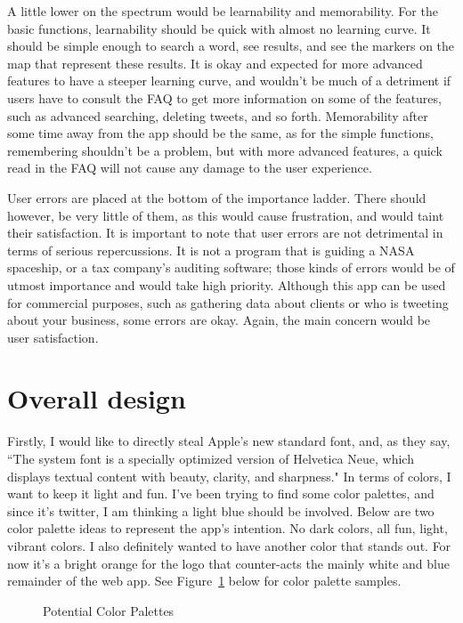 \documentclass[11pt]{article}
\begin{document}
A little lower on the spectrum would be learnability and memorability. For the basic functions, learnability should be quick with almost no learning curve. It should be simple enough to search a word, see results, and see the markers on the map that represent these results. It is okay and expected for more advanced features to have a steeper learning curve, and wouldn't  be much of a detriment if users have to consult the FAQ to get more information on some of the features, such as advanced searching, deleting tweets, and so forth. Memorability after some time away from the app should be the same, as for the simple functions, remembering shouldn't be a problem, but with more advanced features, a quick read in the FAQ will not cause any damage to the user experience.

User errors are placed at the bottom of the importance ladder. There should however, be very little of them, as this would cause frustration, and would taint their satisfaction. It is important to note that user errors are not detrimental in terms of serious repercussions. It is not a program that is guiding a NASA spaceship, or a tax company's auditing software; those kinds of errors would be of utmost importance and would take high priority. Although this app can be used for commercial purposes, such as gathering data about clients or who is tweeting about your business, some errors are okay. Again, the main concern would be user satisfaction.


\section{Overall design}
Firstly, I would like to directly steal Apple's new standard font, and, as they say, ``The system font is a specially optimized version of Helvetica Neue, which displays textual content with beauty, clarity, and sharpness." In terms of colors, I want to keep it light and fun. I've been trying to find some color palettes, and since it's twitter, I am thinking a light blue should be involved.  Below are two color palette ideas to represent the app's intention. No dark colors, all fun, light, vibrant colors. I also definitely wanted to have another color that stands out. For now it's a bright orange for the logo that counter-acts the mainly white and blue remainder of the web app. See Figure~\ref{fig:palette} below for color palette samples.

\begin{figure}[H]
    \centering
    \qquad
    \caption{Potential Color Palettes}
    \label{fig:palette}          

\end{figure}
\end{document}
